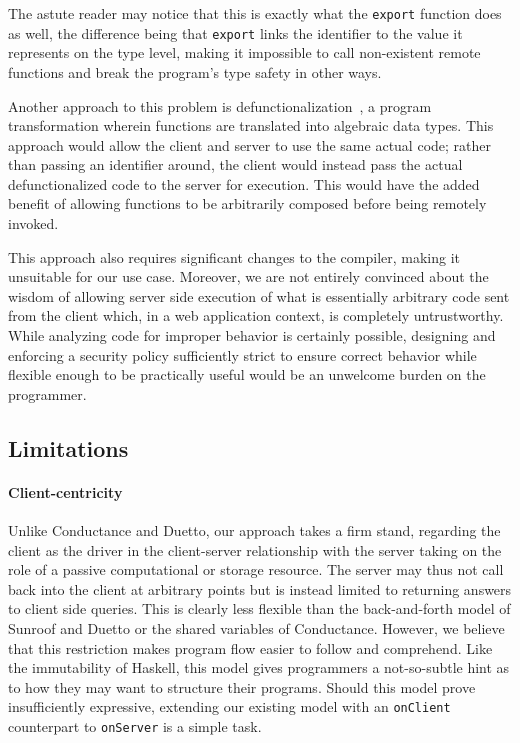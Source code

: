 \documentclass[preprint]{sigplanconf}
\begin{document}
The astute reader may notice that this is exactly what the \lstinline!export!
function does as well, the difference being that \lstinline!export! links the
identifier to the value it represents on the type level, making it impossible
to call non-existent remote functions and break the program's type safety in
other ways.

Another approach to this problem is
defunctionalization\ \cite{defunctionalization}, a program transformation
wherein functions are translated into algebraic data types. This approach would
allow the client and server to use the same actual code; rather than passing
an identifier around, the client would instead pass the actual defunctionalized
code to the server for execution. This would have the added benefit of allowing
functions to be arbitrarily composed before being remotely invoked.

This approach also requires significant changes to the compiler, making it
unsuitable for our use case. Moreover, we are not entirely convinced about the
wisdom of allowing server side execution of what is essentially arbitrary code
sent from the client which, in a web application context, is completely
untrustworthy. While analyzing code for improper behavior is certainly
possible, designing and enforcing a security policy sufficiently strict to
ensure correct behavior while flexible enough to be practically useful would be
an unwelcome burden on the programmer.

\subsection{Limitations}
\label{sec:limitations}

\paragraph{Client-centricity} Unlike Conductance and Duetto, our approach
takes a firm stand, regarding the client as the driver in the client-server
relationship with the server taking on the role of a passive computational
or storage resource. The server may thus not call back into the client at
arbitrary points but is instead limited to returning answers to client side
queries. This is clearly less flexible than the back-and-forth model of Sunroof
and Duetto or the shared variables of Conductance. However, we believe that
this restriction makes program flow easier to follow and comprehend. Like the
immutability of Haskell, this model gives programmers a not-so-subtle hint
as to how they may want to structure their programs. Should this model prove
insufficiently expressive, extending our existing model with an
\lstinline!onClient! counterpart to \lstinline!onServer! is a simple task.
\end{document}
